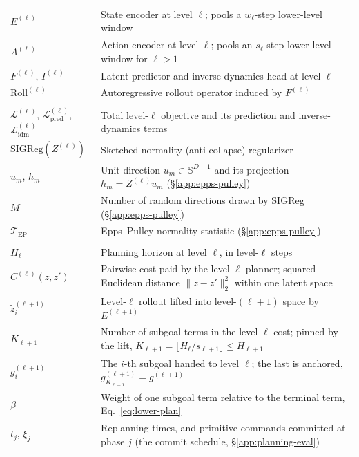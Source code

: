 \begin{table}[H]
\begin{tabular}{@{}l p{}@{}}
$E^{(\ell)}$ & State encoder at level $\ell$; pools a $w_\ell$-step lower-level window \\
$A^{(\ell)}$ & Action encoder at level $\ell$; pools an $s_\ell$-step lower-level window for $\ell > 1$ \\
$F^{(\ell)}$, $I^{(\ell)}$ & Latent predictor and inverse-dynamics head at level $\ell$ \\
$\mathrm{Roll}^{(\ell)}$ & Autoregressive rollout operator induced by $F^{(\ell)}$ \\
\addlinespace[2pt]
\multicolumn{2}{@{}l}{\emph{Training objective}} \\
$\mathcal{L}^{(\ell)}$, $\mathcal{L}^{(\ell)}_{\mathrm{pred}}$, $\mathcal{L}^{(\ell)}_{\mathrm{idm}}$ & Total level-$\ell$ objective and its prediction and inverse-dynamics terms \\
$\mathrm{SIGReg}(Z^{(\ell)})$ & Sketched normality (anti-collapse) regularizer \\
$u_m$, $h_m$ & Unit direction $u_m \in \mathbb{S}^{D-1}$ and its projection $h_m = Z^{(\ell)} u_m$ (\S\ref{app:epps-pulley}) \\
$M$ & Number of random directions drawn by SIGReg (\S\ref{app:epps-pulley}) \\
$\mathcal{T}_{\mathrm{EP}}$ & Epps--Pulley normality statistic (\S\ref{app:epps-pulley}) \\
\addlinespace[2pt]
\multicolumn{2}{@{}l}{\emph{Planning}} \\
$H_\ell$ & Planning horizon at level $\ell$, in level-$\ell$ steps \\
$C^{(\ell)}(z,z')$ & Pairwise cost paid by the level-$\ell$ planner; squared Euclidean distance $\|z-z'\|_2^2$ within one latent space \\
$\tilde{z}^{(\ell+1)}_i$ & Level-$\ell$ rollout lifted into level-$(\ell{+}1)$ space by $E^{(\ell+1)}$ \\
$K_{\ell+1}$ & Number of subgoal terms in the level-$\ell$ cost; pinned by the lift, $K_{\ell+1} = \lfloor H_\ell/s_{\ell+1}\rfloor \le H_{\ell+1}$ \\
$g^{(\ell+1)}_i$ & The $i$-th subgoal handed to level $\ell$; the last is anchored, $g^{(\ell+1)}_{K_{\ell+1}} = g^{(\ell+1)}$ \\
$\beta$ & Weight of one subgoal term relative to the terminal term, Eq.~\eqref{eq:lower-plan} \\
$t_j$, $\xi_j$ & Replanning times, and primitive commands committed at phase $j$ (the commit schedule, \S\ref{app:planning-eval}) \\

\end{tabular}
\end{table}
